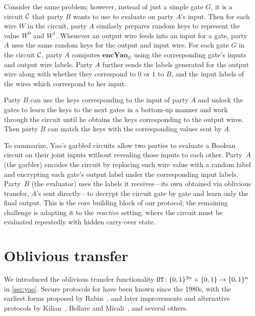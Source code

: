 Consider the same problem; however, instead of just a simple gate $G$, it is a circuit $\mathcal{C}$ that party $B$ wants to use to evaluate on party $A$'s input. Then for each wire $W$ in the circuit, party $A$ similarly prepares random keys to represent the value $W^0$ and $W^1$. Whenever an output wire feeds into an input for a gate, party $A$ uses the same random keys for the output and input wire.
For each gate $G$ in the circuit $\mathcal{C}$, party $A$ computes $\textbf{encYao}_G$ using the corresponding gate's inputs and output wire labels. Party $A$ further sends the labels generated for the output wire along with whether they correspond to $0$ or $1$ to $B$, and the input labels of the wires which correspond to her input.

Party $B$ can use the keys corresponding to the input of party $A$ and unlock the gates to learn the keys to the next gates in a bottom-up manner and work through the circuit until he obtains the keys corresponding to the output wires. Then party $B$ can match the keys with the corresponding values sent by $A$.

To summarize, Yao's garbled circuits allow two parties to evaluate a Boolean circuit on their joint inputs without revealing those inputs to each other. Party~$A$ (the garbler) encodes the circuit by replacing each wire value with a random label and encrypting each gate's output label under the corresponding input labels. Party~$B$ (the evaluator) uses the labels it receives---its own obtained via oblivious transfer, $A$'s sent directly---to decrypt the circuit gate by gate and learn only the final output. This is the core building block of our protocol; the remaining challenge is adapting it to the \emph{reactive} setting, where the circuit must be evaluated repeatedly with hidden carry-over state.

\section{Oblivious transfer}\label{sec:ot}

We introduced the oblivious transfer functionality $\texttt{OT} \colon \{0,1\}^{2n}\times\{0,1\} \to \{0,1\}^n$ in \cref{sec:yao}. Secure protocols for \OT{} have been known since the 1980s, with the earliest forms proposed by Rabin~\cite{Rab81}, and later improvements and alternative protocols by Kilian~\cite{Kil88}, Bellare and Micali~\cite{BM89}, and several others.

